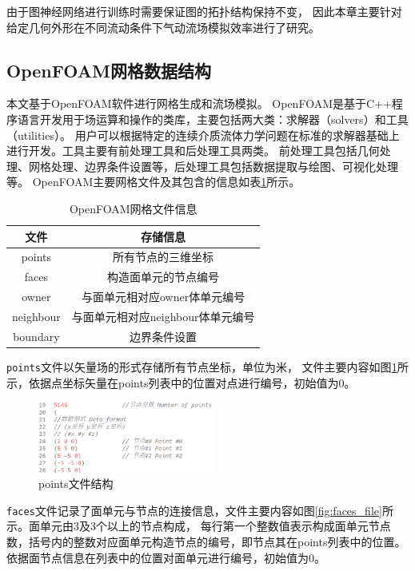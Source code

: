 由于图神经网络进行训练时需要保证图的拓扑结构保持不变，
因此本章主要针对给定几何外形在不同流动条件下气动流场模拟效率进行了研究。



\subsection{OpenFOAM网格数据结构}\label{meshstructure}
本文基于OpenFOAM软件进行网格生成和流场模拟。
OpenFOAM是基于C++程序语言开发用于场运算和操作的类库，主要包括两大类：求解器（solvers）和工具（utilities）。
用户可以根据特定的连续介质流体力学问题在标准的求解器基础上进行开发。工具主要有前处理工具和后处理工具两类。
前处理工具包括几何处理、网格处理、边界条件设置等，后处理工具包括数据提取与绘图、可视化处理等。
OpenFOAM主要网格文件及其包含的信息如表\ref{tab:openfoammesh}所示。

\begin{table}[htp]
	\setlength{\belowcaptionskip}{0.0cm}
	\caption{OpenFOAM网格文件信息}
	\label{tab:openfoammesh}
	\centering
	\begin{tabular}{c|c}
		\toprule
		文件 & 存储信息\\
		\midrule
		points  & 所有节点的三维坐标\\
		\midrule
		faces & 构造面单元的节点编号\\
		\midrule
		owner & 与面单元相对应owner体单元编号\\
		\midrule
		neighbour & 与面单元相对应neighbour体单元编号\\
		\midrule
		boundary & 边界条件设置\\		
		\bottomrule
	\end{tabular}
\end{table}

\texttt{points}文件以矢量场的形式存储所有节点坐标，单位为米，
文件主要内容如图\ref{fig:points_file}所示，依据点坐标矢量在points列表中的位置对点进行编号，初始值为0。

\begin{figure}[htp]
	\centering
	\includegraphics[width=0.52\textwidth]{./figures/points.png}
	\caption{points文件结构}
	\label{fig:points_file}	
\end{figure}

\texttt{faces}文件记录了面单元与节点的连接信息，文件主要内容如图\ref{fig:faces_file}所示。面单元由3及3个以上的节点构成，
每行第一个整数值表示构成面单元节点数，括号内的整数对应面单元构造节点的编号，即节点其在points列表中的位置。
依据面节点信息在列表中的位置对面单元进行编号，初始值为0。

